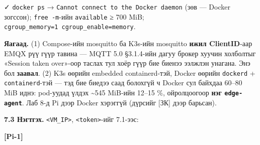 \begin{Shaded}
\begin{Highlighting}[]
\KeywordTok{\&\&} 
\OperatorTok{2\textgreater{}}\KeywordTok{;} 
 \KeywordTok{|} \KeywordTok{;} 
\end{Highlighting}
\end{Shaded}

✓ \texttt{docker\ ps} → \texttt{Cannot\ connect\ to\ the\ Docker\ daemon} (зөв --- Docker зогссон); \texttt{free\ -m}-ийн \texttt{available} ≥ 700 MiB; \texttt{cgroup\_\allowbreak{}memory=\allowbreak{}1\ cgroup\_\allowbreak{}enable=\allowbreak{}memory}.

\textbf{Яагаад.} (1) Compose-ийн mosquitto ба K3s-ийн mosquitto \textbf{ижил ClientID}-аар EMQX рүү гүүр тавина --- MQTT 5.0 §3.1.4-ийн дагуу брокер хуучин холболтыг «Session taken over»-оор таслах тул хоёр гүүр бие биенээ ээлжлэн унагана. Энэ бол \textbf{заавал}. (2) K3s өөрийн embedded containerd-тэй, Docker өөрийн \texttt{dockerd} + \texttt{containerd}-тэй --- тэд бие биедээ саад болохгүй ч Docker сул байхдаа 60--80 MiB иднэ: pod-уудад үлдэх \textasciitilde545 MiB-ийн 12--15 \%, ойролцоогоор \textbf{нэг \texttt{edge-agent}}. Лаб 8-д Pi дээр Docker хэрэггүй (дүрсийг {[}ЗК{]} дээр барьсан).

\textbf{7.3 Нэгтгэх.} \texttt{\textless{}VM\_\allowbreak{}IP\textgreater{}}, \texttt{\textless{}token\textgreater{}}-ийг 7.1-ээс:

\textbf{{[}Pi-1{]}}

\begin{Shaded}
\begin{Highlighting}[]
\KeywordTok{|} \OperatorTok{\textless{}}\OperatorTok{\textgreater{}}\OperatorTok{\textless{}}\OperatorTok{\textgreater{}}
\KeywordTok{|} 
\end{Highlighting}
\end{Shaded}

